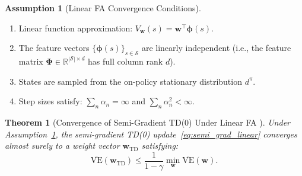 \documentclass[11pt,a4paper]{article}
\theoremstyle{definition}
\newtheorem{assumption}{Assumption}[section]
\theoremstyle{plain}
\newtheorem{theorem}{Theorem}[section]
\theoremstyle{remark}
\newcommand{\R}{\mathbb{R}}
\begin{document}
\begin{assumption}[Linear FA Convergence Conditions]
\label{ass:linear_fa}
\begin{enumerate}[nosep]
    \item Linear function approximation: $V_{\bm{w}}(s) = \bm{w}^\top \bm{\phi}(s)$.
    \item The feature vectors $\{\bm{\phi}(s)\}_{s \in \mathcal{S}}$ are linearly independent (i.e., the feature matrix $\bm{\Phi} \in \R^{|\mathcal{S}| \times d}$ has full column rank $d$).
    \item States are sampled from the on-policy stationary distribution $d^\pi$.
    \item Step sizes satisfy: $\sum_n \alpha_n = \infty$ and $\sum_n \alpha_n^2 < \infty$.
\end{enumerate}
\end{assumption}

\begin{keyresult}
\begin{theorem}[Convergence of Semi-Gradient TD(0) Under Linear FA {\cite{tsitsiklis1997}}]
\label{thm:linear_td_convergence}
Under Assumption~\ref{ass:linear_fa}, the semi-gradient TD(0) update~\eqref{eq:semi_grad_linear} converges almost surely to a weight vector $\bm{w}_{\text{TD}}$ satisfying:
\begin{equation}
    \overline{\text{VE}}(\bm{w}_{\text{TD}}) \leq \frac{1}{1-\gamma}\min_{\bm{w}} \overline{\text{VE}}(\bm{w}).
    \label{eq:td_error_bound}
\end{equation}
\end{theorem}
\end{keyresult}
\end{document}
